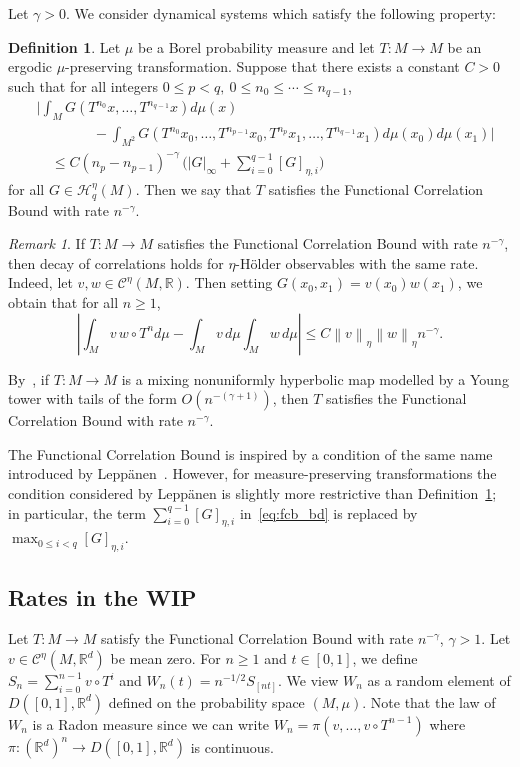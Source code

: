 \documentclass[11pt,a4paper,reqno,oneside]{amsart}
\newcommand{\R}{\ensuremath{\mathbb{R}}}%
\newcommand{\norm}[1]{\left\lVert#1\right\rVert}
\newcommand{\norminf}[1]{\left|#1\right|_\infty}
\newcommand{\holsp}[1][\eta]{\mathcal{C}^{#1}}
\newcommand{\ms}{M}
\newcommand{\sepdholsp}[1]{\mathcal{H}^\eta_{#1}}
\newcommand{\sdsemi}[2]{[#1]_{\eta,#2}}
\newcommand{\dhnorm}[1]{\norm{#1}_\eta}
\theoremstyle{definition}
\newtheorem{defn}[theorem]{Definition}
\theoremstyle{remark}
\newtheorem{remark}[theorem]{Remark}
\numberwithin{equation}{section}
\begin{document}
	
	Let $\gamma>0$. We consider dynamical systems which satisfy the following property:
	\begin{defn}\label{def:fcb}
		Let $ \mu $ be a Borel probability measure and let $ T:M\to M $ be an ergodic $ \mu $-preserving transformation. Suppose that there exists a constant $C>0$ such that for all integers $ 0\le p< q,\ 0\le n_0\le \cdots\le n_{q-1} $,
		\begin{align}
			&\bigg|\int_\ms  G(T^{n_0}x,\dots,T^{n_{q-1}}x)d\mu(x)\nonumber\\
			&\qquad\qquad-\int_{\ms^2} G(T^{n_0}x_0,\dots,T^{n_{p-1}}x_0,T^{n_p}x_1,\dots,T^{n_{q-1}} x_1)d\mu(x_0)d\mu(x_1)\bigg|	\nonumber\\
			&\quad\le C(n_p-n_{p-1})^{-\gamma}\,\biggl(\norminf{G}+\sum_{i=0}^{q-1} \sdsemi{G}{i}\biggr)	\label{eq:fcb_bd}	
		\end{align}
		for all $G\in \sepdholsp{q}(\ms)$. Then we say that $T$ satisfies the Functional Correlation Bound with rate $n^{-\gamma}$.
	\end{defn}
	\begin{remark}\label{rk:fcb_implies_doc}If $T:M\to M$ satisfies the Functional Correlation Bound with rate $n^{-\gamma}$, then decay of correlations holds for $\eta$-H\"older observables with the same rate. Indeed, let $v,w\in \holsp(M,\R)$. Then setting $G(x_0,x_1)=v(x_0)w(x_1)$, we obtain that for all $n\ge 1$,
		\[\left|\int_M v\, w\circ T^n d\mu - \int_M v\, d\mu \int_M w\, d\mu \right|\le C\dhnorm{v}\dhnorm{w}n^{-\gamma}.\]
	\end{remark}	
	By~\cite[Theorem 2.3]{fleming2022}, if $T:M\to M$ is a mixing nonuniformly hyperbolic map modelled by a Young tower with tails of the form $O(n^{-(\gamma+1)})$, then $T$ satisfies the Functional Correlation Bound with rate $n^{-\gamma}$.

	The Functional Correlation Bound is inspired by a condition of the same name introduced by Lepp\"anen~\cite{leppanen2017functional}. However, for measure-preserving transformations the condition considered by Lepp\"anen is slightly more restrictive than Definition~\ref{def:fcb}; in particular, the term $\sum_{i=0}^{q-1}\sdsemi{G}{i}$ in~\eqref{eq:fcb_bd} is replaced by $\max_{0\le i<q}\sdsemi{G}{i}$.
	\subsection{Rates in the WIP} 
	Let $ T:M\to M $ satisfy the Functional Correlation Bound with rate $ n^{-\gamma} $, $ \gamma>1 $. Let $v\in \holsp(M,\R^d)$ be mean zero. For $n\ge 1$ and $t\in [0,1]$, we define
	$ S_n = \sum_{i=0}^{n-1}v\circ T^i $ and $W_n(t) = n^{-1/2}S_{[nt]}$. We view $W_n$ as a random element of $D([0,1],\R^d)$ defined on the probability space $(M,\mu)$. Note that the law of $W_n$ is a Radon measure since we can write $W_n = \pi(v,\dots,v\circ T^{n-1})$ where $\pi:(\R^d)^n \to D([0,1],\R^d)$ is continuous.
\end{document}
